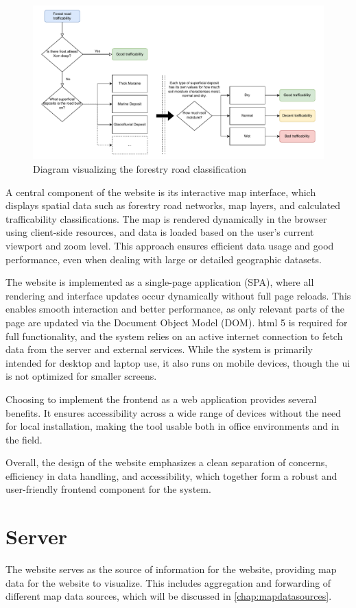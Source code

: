 \begin{figure}[h]
    \centering
    \centerline{\includegraphics[width=1.2\linewidth]{figures/roadclassification.pdf}}
    \caption{Diagram visualizing the forestry road classification}
    \label{fig:forestryroadclassification}
\end{figure}

A central component of the website is its interactive map interface, which displays spatial data such as forestry road networks, map layers, and calculated trafficability classifications. The map is rendered dynamically in the browser using client-side resources, and data is loaded based on the user’s current viewport and zoom level. This approach ensures efficient data usage and good performance, even when dealing with large or detailed geographic datasets.

The website is implemented as a single-page application (SPA), where all rendering and interface updates occur dynamically without full page reloads. This enables smooth interaction and better performance, as only relevant parts of the page are updated via the Document Object Model (DOM). \acrshort{html} 5 is required for full functionality, and the system relies on an active internet connection to fetch data from the server and external services. While the system is primarily intended for desktop and laptop use, it also runs on mobile devices, though the \acrshort{ui} is not optimized for smaller screens.

Choosing to implement the frontend as a web application provides several benefits. It ensures accessibility across a wide range of devices without the need for local installation, making the tool usable both in office environments and in the field.

Overall, the design of the website emphasizes a clean separation of concerns, efficiency in data handling, and accessibility, which together form a robust and user-friendly frontend component for the system.

\section{Server}

The website serves as the source of information for the website, providing map data for the website to visualize. This includes aggregation and forwarding of different map data sources, which will be discussed in \autoref{chap:mapdatasources}.


